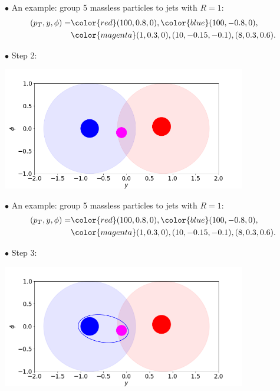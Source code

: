 \documentclass[9pt,a4paper,unknownkeysallowed,xcolor=dvipsnames,aspectratio=43]{beamer}
\begin{document}
%
%
%
\begin{frame}\vspace{2mm}

{\color{darkred}\Large$\bullet$} An example: group 5 massless particles to jets with $R=1$:
\begin{align}
(p_T, y, \phi) = &{\color{red}(100, 0.8, 0)}, {\color{blue}(100, -0.8, 0)},\notag\\
&{\color{magenta}(1, 0.3, 0), (10, -0.15, -0.1), (8, 0.3, 0.6)}.\notag
\end{align}

{\color{darkred}\Large$\bullet$} Step 2:
\vspace{2mm}
\begin{center}
\includegraphics[width=0.8\textwidth]{kt2.png}
\end{center}
\end{frame}
%
%
\begin{frame}\vspace{2mm}

{\color{darkred}\Large$\bullet$} An example: group 5 massless particles to jets with $R=1$:
\begin{align}
(p_T, y, \phi) = &{\color{red}(100, 0.8, 0)}, {\color{blue}(100, -0.8, 0)},\notag\\
&{\color{magenta}(1, 0.3, 0), (10, -0.15, -0.1), (8, 0.3, 0.6)}.\notag
\end{align}

{\color{darkred}\Large$\bullet$} Step 3:
\vspace{2mm}
\begin{center}
\includegraphics[width=0.8\textwidth]{kt23.png}
\end{center}
\end{frame}
\end{document}
